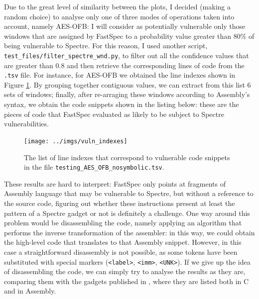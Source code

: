 \documentclass[12pt,a4paper]{book}
\theoremstyle{definition}
\begin{document}
	Due to the great level of similarity between the plots, I decided (making a random choice) to analyse only one of three modes of operations taken into account, namely AES-OFB: I will consider as potentially vulnerable only those windows that are assigned by FastSpec to a probability value greater than 80\% of being vulnerable to Spectre. For this reason, I used another script, \texttt{test\_files/filter\_spectre\_wnd.py}, to filter out all the confidence values that are greater than 0.8 and then retrieve the corresponding lines of code from the \texttt{.tsv} file. For instance, for AES-OFB we obtained the line indexes shown in Figure \ref{fig:idx}. By grouping together contiguous values, we can extract from this list 6 sets of windows; finally, after re-arraging these windows according to Assembly's 
	syntax, we obtain the code snippets shown in the listing below: these are the pieces of code that FastSpec evaluated as likely to be subject to Spectre vulnerabilities.
	
	\begin{figure}[!ht]
		\centering
		\texttt{[image: ../imgs/vuln\_indexes]}
		\caption{The list of line indexes that correspond to vulnerable code snippets in the file \texttt{testing\_AES\_OFB\_nosymbolic.tsv}.}
		\label{fig:idx}
	\end{figure}

	These results are hard to interpret: FastSpec only points at fragments of Assembly language that may be vulnerable to Spectre, but without a reference to the source code, figuring out whether these instructions present at least the pattern of a Spectre gadget or not is definitely a challenge. One way around this problem would be disassembling the code, namely applying an algorithm that performs the inverse transformation of the assembler: in this way, we could obtain the high-level code that translates to that Assembly snippet. However, in this case a straightforward disassembly is not possible, as some tokens have been substituted with special markers (\texttt{<label>}, \texttt{<imm>}, \texttt{<UNK>}). If we give up the idea of disassembling the code, we can simply try to analyse the results as they are, comparing them with the gadgets published in \cite{Kocher2018}, where they are listed both in C and in Assembly.
	
\end{document}
